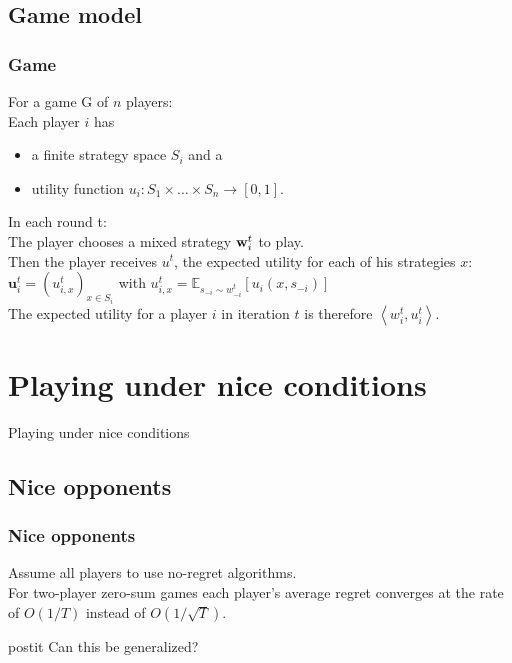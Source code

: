 \documentclass{beamer}
\renewcommand{\vec}[1]{\ensuremath{{\bf #1}}}
\begin{document}
\subsection{Game model}
\begin{frame}
	\frametitle{Game}
	For a game G of $n$ players:\\
	Each player $i$ has 
	\begin{itemize}
		\item a finite strategy space $S_i$ and a
		\item utility function $u_i : S_1 \times \ldots \times S_n \rightarrow [0,1]$.
	\end{itemize}\pause
	\vspace{1em}
	In each round t:\\
	The player chooses a  mixed strategy $\vec{w}^t_i$ to play. \\ \pause
	Then the player receives $u^t$, the expected utility for each of his strategies $x$: $\mathbf{u}^t_i = (u^t_{i,x})_{x \in S_i} $ with $ u^t_{i,x} = \mathbb{E}_{s_{-i} \sim w^t_{-i}} \left[u_i(x,s_{-i})\right] $ \pause \\
	The expected utility for a player $i$ in iteration $t$ is therefore  $ \left\langle w^t_{i},u^t_{i}\right\rangle $.
	
\end{frame}





\section{Playing under nice conditions}
\begin{frame}[c]
	\begin{center}
		\Huge Playing under nice conditions
	\end{center}
\end{frame}
\subsection{Nice opponents}
\begin{frame}
	\frametitle{Nice opponents}
%
	Assume all players to use no-regret algorithms.\\ \pause
	\vspace{1em} 
	For two-player zero-sum games each player's average regret converges at the rate of $O(1/T)$ instead of $O(1/\sqrt{T})$.\\ \pause
	\vspace{1em}
	\begin{beamercolorbox}[sep=1em]{postit}
		Can this be generalized?
	\end{beamercolorbox}
	
\end{frame}
\end{document}
